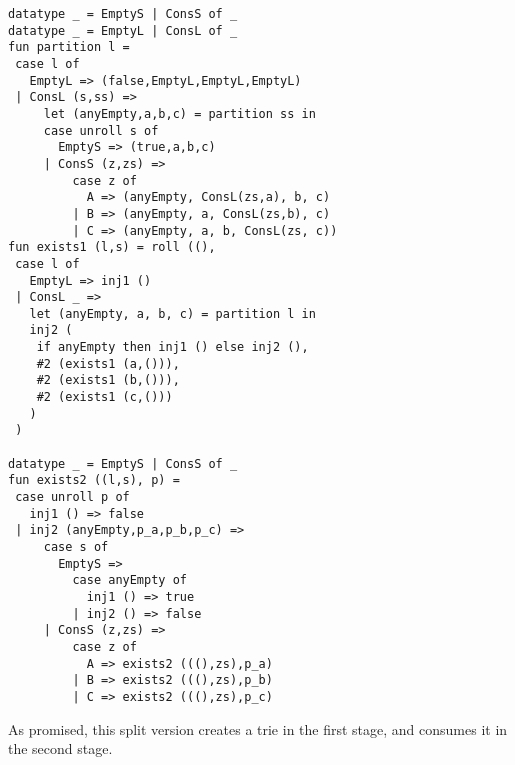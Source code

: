 \begin{lstlisting} 
datatype _ = EmptyS | ConsS of _
datatype _ = EmptyL | ConsL of _
fun partition l =
 case l of
   EmptyL => (false,EmptyL,EmptyL,EmptyL)
 | ConsL (s,ss) =>
     let (anyEmpty,a,b,c) = partition ss in
     case unroll s of
       EmptyS => (true,a,b,c)
     | ConsS (z,zs) =>
         case z of 
           A => (anyEmpty, ConsL(zs,a), b, c) 
         | B => (anyEmpty, a, ConsL(zs,b), c) 
         | C => (anyEmpty, a, b, ConsL(zs, c))
fun exists1 (l,s) = roll ((), 
 case l of 
   EmptyL => inj1 ()
 | ConsL _ => 
   let (anyEmpty, a, b, c) = partition l in
   inj2 (
   	if anyEmpty then inj1 () else inj2 (), 
   	#2 (exists1 (a,())), 
   	#2 (exists1 (b,())), 
   	#2 (exists1 (c,()))
   )
 )

datatype _ = EmptyS | ConsS of _
fun exists2 ((l,s), p) =
 case unroll p of 
   inj1 () => false
 | inj2 (anyEmpty,p_a,p_b,p_c) => 
     case s of
       EmptyS => 
         case anyEmpty of 
           inj1 () => true 
         | inj2 () => false
     | ConsS (z,zs) =>
         case z of
           A => exists2 (((),zs),p_a)
         | B => exists2 (((),zs),p_b)
         | C => exists2 (((),zs),p_c)
\end{lstlisting}

As promised, this split version creates a trie in the first stage, and consumes it in the second stage.
